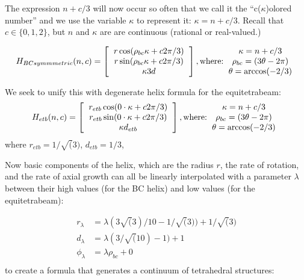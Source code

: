 \documentclass[11pt]{article}
\begin{document}
The expression $n+c/3$ will now occur so often that we call it the ``c($\kappa$)olored number'' and we use the variable $\kappa$ to represent it: $\kappa = n+c/3$.
Recall that $c \in \{0,1,2\}$, but $n$ and $\kappa$ are are continuous (rational or real-valued.)

\[
H_{BCsymmmetric}(n,c) =
\left [
  \begin{tabular}{c}
   $ r  \cos(\rho_{bc} \kappa  + c 2 \pi /3) $\\
   $ r  \sin(\rho_{bc} \kappa  + c 2 \pi /3) $\\
   $ \kappa 3  d $
  \end{tabular}
  \right ],
\text{where:}
  \begin{tabular}{c}
 $\kappa = n + c/3$ \\
    $\rho_{bc} = (3 \theta - 2 \pi)$ \\
   $ \theta = \arccos(-2/3) $
  \end{tabular}      
\]

We seek to unify this with degenerate helix formula for the equitetrabeam:
\[
H_{etb}(n,c) =
\left [
  \begin{tabular}{c}
   $ r_{etb}  \cos( 0 \cdot \kappa  + c 2 \pi /3) $\\
   $ r_{etb}  \sin( 0 \cdot \kappa  + c 2 \pi /3) $\\
   $ \kappa d_{etb} $
  \end{tabular}
\right ],
\text{where:}
  \begin{tabular}{c}
 $\kappa = n + c/3$ \\
    $\rho_{bc} = (3 \theta - 2 \pi)$ \\
   $ \theta = \arccos(-2/3) $
  \end{tabular}      
\]
where $ r_{etb} = 1/\sqrt(3)$, $d_{etb} = 1/3$,

Now basic components of the helix, which are the radius $r$, the rate of rotation, and the rate of
axial growth can all be linearly interpolated with a parameter $\lambda$ between their high values (for the BC helix)
and low values (for the equitetrabeam):

\begin{align*}
r_{\lambda}  &=  \lambda (3 \sqrt(3) / 10 - 1/\sqrt(3)) +  1/\sqrt(3) \\
d_{\lambda} &=   \lambda (3 / \sqrt(10) - 1)+ 1 \\
\phi_{\lambda} &=  \lambda \rho_{bc}  + 0\\
\end{align*}
to create a formula that generates a continuum of tetrahedral structures:
\end{document}
